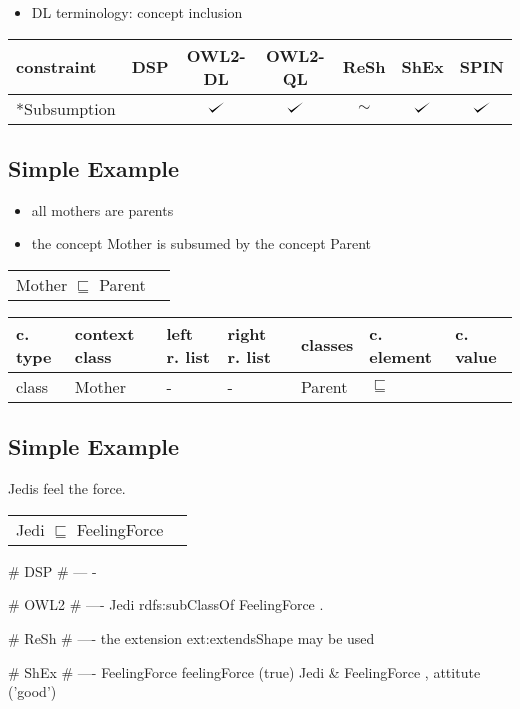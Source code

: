 \documentclass{llncs}
\newenvironment{gcotable}{
  \scriptsize
  \sffamily
  \vspace{0.3cm}
	\begin{center}
  \begin{tabular}{l|l|l|l|l|l|l}
  \hline
  \textbf{c. type} & \textbf{context class} & \textbf{left r. list} & \textbf{right r. list} & \textbf{classes} & \textbf{c. element} & \textbf{c. value} \\
  \hline

}{
  \hline
  \end{tabular}
	\end{center}
}
\newenvironment{DL}{
	\begin{center}
  \begin{tabular}{r l}

}{
  \end{tabular}
	\end{center}
}
\newenvironment{evaluation}{
  \scriptsize
  \sffamily
  \vspace{0.3cm}
	\begin{center}
  \begin{tabular}{l|c|c|c|c|c|c}
  \hline
  \textbf{constraint} & \textbf{DSP} & \textbf{OWL2-DL} & \textbf{OWL2-QL} & \textbf{ReSh} & \textbf{ShEx} & \textbf{SPIN} \\
  \hline

}{
  \hline
  \end{tabular}
  \linebreak
	\end{center}
}
\def\checkmark{\tikz\fill[scale=0.4](0,.35) -- (.25,0) -- (1,.7) -- (.25,.15) -- cycle;}
\begin{document}
\begin{itemize}
	\item DL terminology: concept inclusion
\end{itemize}

\begin{evaluation}
*Subsumption & \ding{55} & $\checkmark$ & $\checkmark$ & $\sim$ & $\checkmark$ & $\checkmark$ \\
\end{evaluation}

\subsection{Simple Example}

\begin{itemize}
	\item all mothers are parents
  \item the concept Mother is subsumed by the concept Parent
\end{itemize}

\begin{DL}
Mother $\sqsubseteq$ Parent \\
\end{DL}

\begin{gcotable}
class & Mother & - & - & Parent & $\sqsubseteq$ \\
\end{gcotable}

\subsection{Simple Example}

Jedis feel the force. 

\begin{DL}
Jedi $\sqsubseteq$ FeelingForce
\end{DL}

\begin{ex}
# DSP
# ---
-
\end{ex}

\begin{ex}
# OWL2
# ----
Jedi rdfs:subClassOf FeelingForce .
\end{ex}

\begin{ex}
# ReSh
# ----
the extension ext:extendsShape may be used
\end{ex}

\begin{ex}
# ShEx
# ----
FeelingForce {
    feelingForce (true) }
Jedi {
    & FeelingForce ,
    attitute ('good') }
\end{ex}
\end{document}
